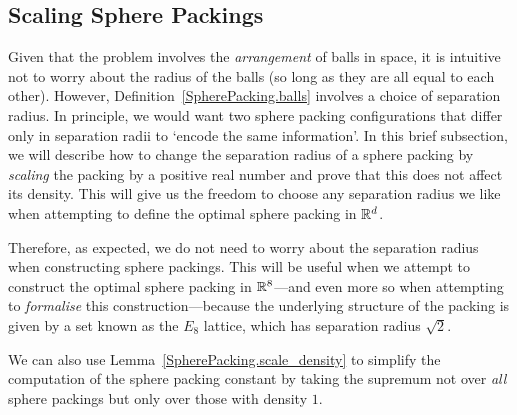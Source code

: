 \subsection{Scaling Sphere Packings}

Given that the problem involves the \emph{arrangement} of balls in space, it is intuitive not to worry about the radius of the balls (so long as they are all equal to each other). However, Definition~\ref{SpherePacking.balls} involves a choice of separation radius. In principle, we would want two sphere packing configurations that differ only in separation radii to `encode the same information'. In this brief subsection, we will describe how to change the separation radius of a sphere packing by \emph{scaling} the packing by a positive real number and prove that this does not affect its density. This will give us the freedom to choose any separation radius we like when attempting to define the optimal sphere packing in $\mathbb{R}^d$.






Therefore, as expected, we do not need to worry about the separation radius when constructing sphere packings. This will be useful when we attempt to construct the optimal sphere packing in $\mathbb{R}^8$---and even more so when attempting to \emph{formalise} this construction---because the underlying structure of the packing is given by a set known as the $E_8$ lattice, which has separation radius $\sqrt{2}$.

We can also use Lemma~\ref{SpherePacking.scale_density} to simplify the computation of the sphere packing constant by taking the supremum not over \emph{all} sphere packings but only over those with density $1$.


